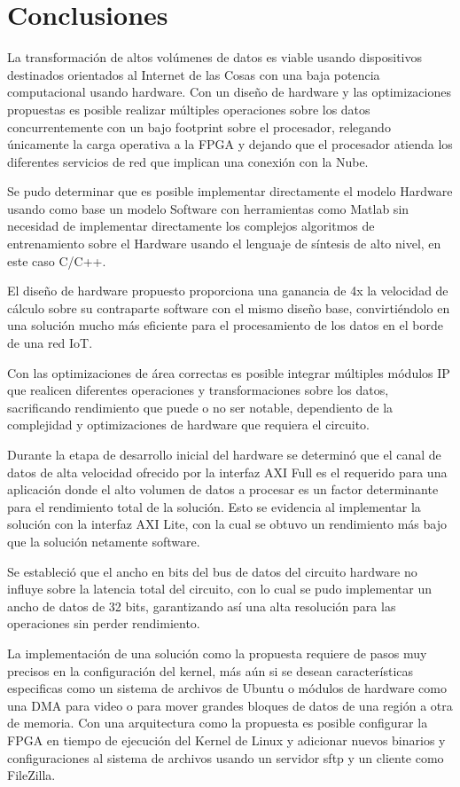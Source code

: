 
\chapter{Conclusiones} %
\label{Chapter14}

La transformación de altos volúmenes de datos es viable usando dispositivos destinados orientados al Internet de las Cosas con una baja potencia computacional usando hardware. Con un diseño de hardware y las optimizaciones propuestas es posible realizar múltiples operaciones sobre los datos concurrentemente con un bajo footprint sobre el procesador, relegando únicamente la carga operativa a la FPGA y dejando que el procesador atienda los diferentes servicios de red que implican una conexión con la Nube.

Se pudo determinar que es posible implementar directamente el modelo Hardware usando como base un modelo Software con herramientas como Matlab sin necesidad de implementar directamente los complejos algoritmos de entrenamiento sobre el Hardware usando el lenguaje de síntesis de alto nivel, en este caso C/C++.

El diseño de hardware propuesto proporciona una ganancia de 4x la velocidad de cálculo sobre su contraparte software con el mismo diseño base, convirtiéndolo en una solución mucho más eficiente para el procesamiento de los datos en el borde de una red IoT.

Con las optimizaciones de área correctas es posible integrar múltiples módulos IP que realicen diferentes operaciones y transformaciones sobre los datos, sacrificando rendimiento que puede o no ser notable, dependiento de la complejidad y optimizaciones de hardware que requiera el circuito.

Durante la etapa de desarrollo inicial del hardware se determinó que el canal de datos de alta velocidad ofrecido por la interfaz AXI Full es el requerido para una aplicación donde el alto volumen de datos a procesar es un factor determinante para el rendimiento total de la solución. Esto se evidencia al implementar la solución con la interfaz AXI Lite, con la cual se obtuvo un rendimiento más bajo que la solución netamente software.

Se estableció que el ancho en bits del bus de datos del circuito hardware no influye sobre la latencia total del circuito, con lo cual se pudo implementar un ancho de datos de 32 bits, garantizando así una alta resolución para las operaciones sin perder rendimiento.

La implementación de una solución como la propuesta requiere de pasos muy precisos en la configuración del kernel, más aún si se desean características especificas como un sistema de archivos de Ubuntu o módulos de hardware como una DMA para video o para mover grandes bloques de datos de una región a otra de memoria. Con una arquitectura como la propuesta es posible configurar la FPGA en tiempo de ejecución del Kernel de Linux y adicionar nuevos binarios y configuraciones al sistema de archivos usando un servidor sftp y un cliente como FileZilla.
